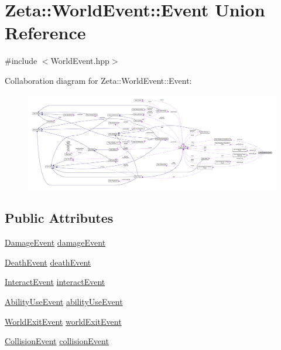 \hypertarget{unionZeta_1_1WorldEvent_1_1Event}{\section{Zeta\+:\+:World\+Event\+:\+:Event Union Reference}
\label{unionZeta_1_1WorldEvent_1_1Event}
}


{\ttfamily \#include $<$World\+Event.\+hpp$>$}



Collaboration diagram for Zeta\+:\+:World\+Event\+:\+:Event\+:
\nopagebreak
\begin{figure}[H]
\begin{center}
\leavevmode
\includegraphics[width=350pt]{unionZeta_1_1WorldEvent_1_1Event__coll__graph}
\end{center}
\end{figure}
\subsection*{Public Attributes}
\begin{DoxyCompactItemize}
\item 
\hyperlink{structZeta_1_1WorldEvent_1_1DamageEvent}{Damage\+Event} \hyperlink{unionZeta_1_1WorldEvent_1_1Event_a209ed7daf76d79c4bf4000670b221aa3}{damage\+Event}
\item 
\hyperlink{structZeta_1_1WorldEvent_1_1DeathEvent}{Death\+Event} \hyperlink{unionZeta_1_1WorldEvent_1_1Event_a7890bab8e592e6c494dda0a747eec848}{death\+Event}
\item 
\hyperlink{structZeta_1_1WorldEvent_1_1InteractEvent}{Interact\+Event} \hyperlink{unionZeta_1_1WorldEvent_1_1Event_a6a15dbd736564d471da9539d726eb0b7}{interact\+Event}
\item 
\hyperlink{structZeta_1_1WorldEvent_1_1AbilityUseEvent}{Ability\+Use\+Event} \hyperlink{unionZeta_1_1WorldEvent_1_1Event_aad3c685154206580c34f3c2395617520}{ability\+Use\+Event}
\item 
\hyperlink{structZeta_1_1WorldEvent_1_1WorldExitEvent}{World\+Exit\+Event} \hyperlink{unionZeta_1_1WorldEvent_1_1Event_afce93a16f939122fc59048073f235613}{world\+Exit\+Event}
\item 
\hyperlink{structZeta_1_1WorldEvent_1_1CollisionEvent}{Collision\+Event} \hyperlink{unionZeta_1_1WorldEvent_1_1Event_a5eeaa0a2b92852f85503402cbf6f12fa}{collision\+Event}
\end{DoxyCompactItemize}


